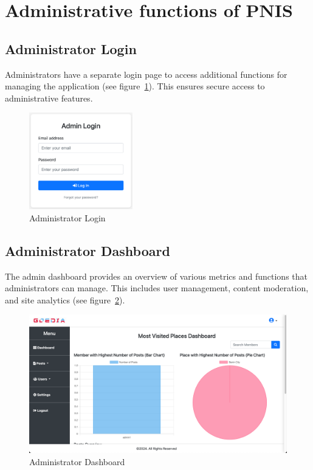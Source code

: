 \section{Administrative functions of PNIS}
\subsection{Administrator Login}
Administrators have a separate login page to access additional functions for managing the application (see figure~\ref{fig:adminLogin}). This ensures secure access to administrative features.
\begin{figure}[htb]
    \centering
    \includegraphics[width=0.4\textwidth]{adminLogin.png}
    \caption{Administrator Login}
    \label{fig:adminLogin}
\end{figure}

\subsection{Administrator Dashboard}
The admin dashboard provides an overview of various metrics and functions that administrators can manage. This includes user management, content moderation, and site analytics (see figure~\ref{fig:adminDash}).
\begin{figure}[htb]
    \centering
    \includegraphics[width=\textwidth]{adminDash.png}
    \caption{Administrator Dashboard}
    \label{fig:adminDash}
\end{figure}

